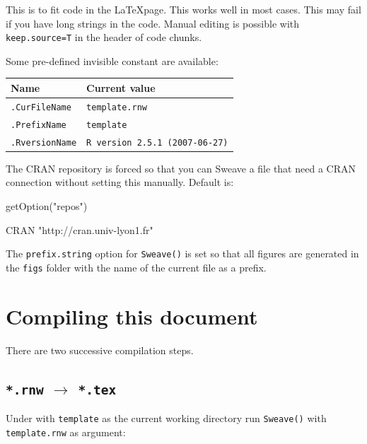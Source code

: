 \documentclass{article}
\begin{document}
This is to fit \Rlogo{} code in the \LaTeX page. This works well
in most cases. This may fail if you have long strings in the code.
Manual editing is possible with \texttt{keep.source=T} in the header
of code chunks.

\vspace{0.2cm}
Some pre-defined invisible \Rlogo{} constant are available:

\begin{tabular}{ll}
\hline \hline
Name & Current value\\
\hline
\texttt{.CurFileName} & \texttt{template.rnw}\\
\texttt{.PrefixName} & \texttt{template}\\
\texttt{.RversionName} & \texttt{R version 2.5.1 (2007-06-27)}\\
\hline \hline
\end{tabular}
\vspace{0.2cm}

The CRAN repository is forced so that you can Sweave a file that
need a CRAN connection without setting this manually. Default
is:

\begin{Schunk}
\begin{Sinput}
 getOption("repos")
\end{Sinput}
\begin{Soutput}
                       CRAN 
"http://cran.univ-lyon1.fr" 
\end{Soutput}
\end{Schunk}

\vspace{0.2cm}
The \texttt{prefix.string} option for \texttt{Sweave()} is set
so that all figures are generated in the \texttt{figs} folder with
the name of the current file as a prefix.

\section{Compiling this document}

There are two successive compilation steps.

\subsection{\texttt{*.rnw} $\rightarrow$ \texttt{*.tex}}

Under \Rlogo{} with \texttt{template} as the current working directory
run \texttt{Sweave()} with \texttt{template.rnw} as argument:
\end{document}
